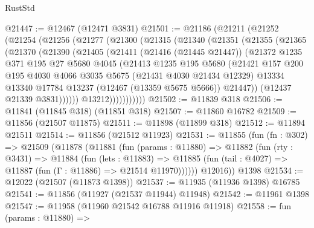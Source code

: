 \begin{lexlean}{RustStd}
\begin{coremodule}
@21447 := @12467 (@12471 @3831)
@21501 := @21186
    (@21211
      (@21252
        (@21254
          (@21256
            (@21277
              (@21300
                (@21315
                  (@21340
                    (@21351
                      (@21355
                        (@21365
                          (@21370
                            (@21390
                              (@21405
                                (@21411
                                  (@21416 (@21445 @21447))
                                  (@21372
                                    @1235
                                    @371
                                    @195
                                    @27
                                    @5680
                                    @4045
                                    (@21413
                                      @1235
                                      @195
                                      @5680
                                      (@21421
                                        @157
                                        @200
                                        @195
                                        @4030
                                        @4066
                                        @3035
                                        @5675
                                        (@21431 @4030 @21434 @12329)
                                        @13334
                                        @13340
                                        @17784
                                        @13237
                                        (@12467 (@13359 @5675 @5666))
                                        @21447))
                                    (@12437 @21339 @3831))))))
                          @13212)))))))))))
@21502 := @11839 @318
@21506 := @11841 (@11845 @318) (@11851 @318)
@21507 := @11860 @16782
@21509 := @11856 (@21507 @11875)
@21511 := @11898 (@11899 @318)
@21512 := @11894 @21511
@21514 := @11856 (@21512 @11923)
@21531 := @11855
    (fun (fn : @302) =>
    @21509
      (@11878
        (@11881
          (fun (params : @11880) =>
          @11882
            (fun (rty : @3431) =>
            @11884
              (fun (lets : @11883) =>
              @11885 (fun (tail : @4027) => @11887 (fun (Γ : @11886) => @21514 @11970))))))
        @12016))
    @1398
@21534 := @12022 (@21507 (@11873 @1398))
@21537 := @11935 (@11936 @1398) @16785
@21541 := @11856 (@11927 (@21537 @11944) @11948)
@21542 := @11961 @1398
@21547 := @11958 (@11960 @21542 @16788 @11916 @11918)
@21558 := fun (params : @11880) =>

\end{coremodule}
\end{lexlean}
